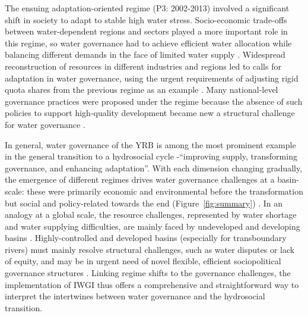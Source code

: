 The ensuing adaptation-oriented regime (P3: 2002-2013) involved a significant shift in society to adapt to stable high water stress.
Socio-economic trade-offs between water-dependent regions and sectors played a more important role in this regime, so water governance had to achieve efficient water allocation while balancing different demands in the face of limited water supply
\cite{dalin2015,song2022}.
Widespread reconstruction of resources in different industries and regions led to calls for adaptation in water governance, using the urgent requirements of adjusting rigid quota shares from the previous regime as an example \cite{wang2019a}.
Many national-level governance practices were proposed under the regime because the absence of such policies to support high-quality development became new a structural challenge for water governance
\cite{konar2019}.

In general, water governance of the YRB is among the most prominent example in the general transition to a hydrosocial cycle -``improving supply, transforming governance, and enhancing adaptation''.
With each dimension changing gradually, the emergence of different regimes drives water governance challenges at a basin-scale: these were primarily economic and environmental before the transformation but social and policy-related towards the end (Figure~\ref{fig:summary}) \cite{singh2019,porcher2019}.
In an analogy at a global scale, the resource challenges, represented by water shortage and water supplying difficulties, are mainly faced by undeveloped and developing basins
\cite{allan2019,speed2013,liu2012a}.
Highly-controlled and developed basins (especially for transboundary rivers) must mainly resolve structural challenges, such as water disputes or lack of equity, and may be in urgent need of novel flexible, efficient sociopolitical governance structures
\cite{unep-dhi2016,mirumachi2015}.
Linking regime shifts to the governance challenges, the implementation of IWGI thus offers a comprehensive and straightforward way to interpret the intertwines between water governance and the hydrosocial transition.

